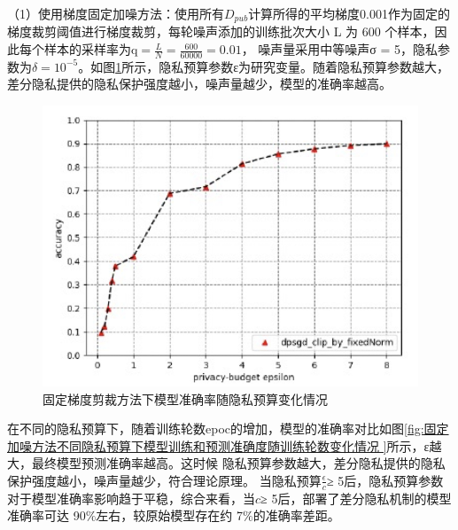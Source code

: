 （1）使用梯度固定加噪方法：使用所有$D_{p u b}$计算所得的平均梯度0.001作为固定的梯度裁剪阈值进行梯度裁剪，每轮噪声添加的训练批次大小 L 为 600 个样本，因此每个样本的采样率为$\mathrm{q}=\frac{L}{N}=\frac{600}{60000}=0.01$，
噪声量采用中等噪声σ = 5，隐私参数为$\delta=10^{-5}$。如图\ref{fig:固定梯度剪裁方法下模型准确率随隐私预算变化情况}所示，隐私预算参数ε为研究变量。随着隐私预算参数越大，差分隐私提供的隐私保护强度越小，噪声量越少，模型的准确率越高。
\begin{figure}[!hbt]
\centering
  	\includegraphics[scale=0.6]{fig2/C5/梯度剪裁}%
	\caption{固定梯度剪裁方法下模型准确率随隐私预算变化情况}
  	\label{fig:固定梯度剪裁方法下模型准确率随隐私预算变化情况} 
\end{figure}

在不同的隐私预算下，随着训练轮数epoc的增加，模型的准确率对比如图\ref{fig:固定加噪方法不同隐私预算下模型训练和预测准确度随训练轮数变化情况 
}所示，ε越大，最终模型预测准确率越高。这时候
隐私预算参数越大，差分隐私提供的隐私保护强度越小，噪声量越少，符合理论原理。  当隐私预算$\frac{\epsilon}{c}$≥ 5后，隐私预算参数对于模型准确率影响趋于平稳，综合来看，当$c$≥ 5后，部署了差分隐私机制的模型准确率可达 90$\%$左右，较原始模型存在约 7$\%$的准确率差距。


